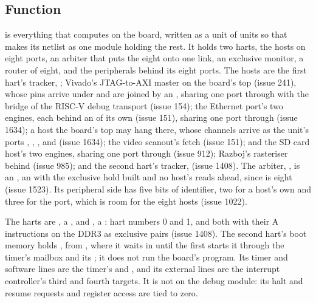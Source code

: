 
%
{}

\subsection*{Function}

 is everything that computes on the board, written as a
unit of units so that \code{\#[lower]} makes its netlist as one module
holding the rest. It holds two harts, the hosts on eight ports, an
arbiter that puts the eight onto one link, an exclusive monitor, a router of eight,
and the peripherals behind its eight ports. The hosts are the first
hart's tracker, ; Vivado's JTAG-to-AXI master
on the board's top (issue 241), whose pins arrive under 
and are joined by an , sharing one port through
 with the bridge of the RISC-V debug transport (issue 154);
the Ethernet port's two engines, each behind an  of its
own (issue 151), sharing one port through  (issue 1634);
a host the board's top may hang there, whose channels arrive as the
unit's ports , , ,
 and  (issue 1634); the video scanout's
fetch (issue 151); and the SD card
host's two engines, sharing one port through  (issue 912);
Razboj's rasteriser behind  (issue 985); and the second
hart's tracker,  (issue 1408).
The arbiter, , is an
, an
 with the exclusive hold built and no host's reads
ahead, since  is eight (issue 1523). Its peripheral
side has five bits of identifier, two for a host's own and three for
the port, which is room for the eight hosts (issue 1022).

The harts are , a , and
, a : hart numbers 0 and 1,
and both with their A instructions on the DDR3 as exclusive pairs
(issue 1408). The second hart's boot memory holds , from
, where it waits in  until the first starts it
through the timer's mailbox and its ; it does not run the
board's program. Its timer and software lines are the timer's
 and , and its external lines are the
interrupt controller's third and fourth targets. It is not on the
debug module: its halt and resume requests and register access are
tied to zero.

